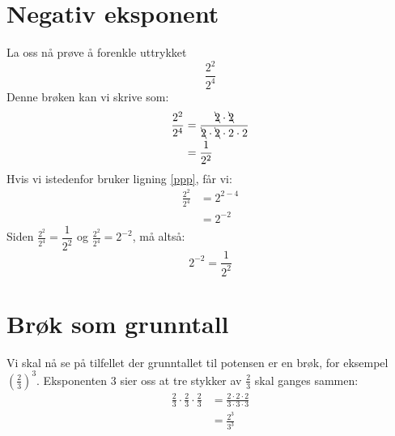 \section{Negativ eksponent}
La oss nå prøve å forenkle uttrykket 
\[ \frac{2^{2}}{2^{4}} \]
Denne brøken kan vi skrive som: 
\begin{align*}
\frac{2^{2}}{2^{4}} & =\frac{\bcancel{2}\cdot\bcancel{2}}{\bcancel{2}\cdot\bcancel{2}\cdot2\cdot2}\\
 & =\frac{1}{2^{2}}
\end{align*}
Hvis vi istedenfor bruker ligning \eqref{ppp}, får vi: 
\begin{align*}
\frac{2^{2}}{2^{4}} & =2^{2-4}\\
 & =2^{-2}
\end{align*}
Siden ${\frac{2^{2}}{2^{4}}=\dfrac{1}{2^{2}}}$ og ${\frac{2^{2}}{2^{4}}=2^{-2}}$,
må altså:
\[ 2^{-2}=\frac{1}{2^{2}} \]

\eks[1]{\vspace{-20 pt}
\[
3^{-5}=\frac{1}{3^{5}}
\] \vspace{-10 pt}
}
\eks[2]{\vspace{-20 pt}\[
c^{-7}=\frac{1}{c^{7}}
\]\vspace{-10 pt}}
\section{Brøk som grunntall}
Vi skal nå se på tilfellet der grunntallet til potensen er en
brøk, for eksempel $\left(\frac{2}{3}\right)^{3}$. Eksponenten 3
sier oss at tre stykker av $\frac{2}{3}$ skal ganges sammen:
\begin{align*}
\frac{2}{3}\cdot\frac{2}{3}\cdot\frac{2}{3} & =\frac{2\cdot2\cdot2}{3\cdot3\cdot3}\\
 & =\frac{2^{3}}{3^{3}}
\end{align*}

